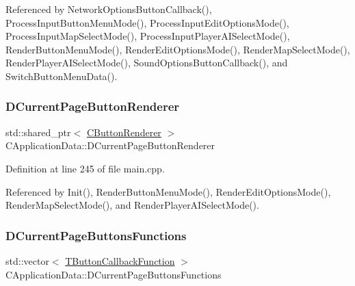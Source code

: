 Referenced by Network\+Options\+Button\+Callback(), Process\+Input\+Button\+Menu\+Mode(), Process\+Input\+Edit\+Options\+Mode(), Process\+Input\+Map\+Select\+Mode(), Process\+Input\+Player\+A\+I\+Select\+Mode(), Render\+Button\+Menu\+Mode(), Render\+Edit\+Options\+Mode(), Render\+Map\+Select\+Mode(), Render\+Player\+A\+I\+Select\+Mode(), Sound\+Options\+Button\+Callback(), and Switch\+Button\+Menu\+Data().

\hypertarget{classCApplicationData_abfe1743f2634b069ccc811db4a8733a8}{}\label{classCApplicationData_abfe1743f2634b069ccc811db4a8733a8} 
\subsubsection{\texorpdfstring{D\+Current\+Page\+Button\+Renderer}{DCurrentPageButtonRenderer}}
{\footnotesize\ttfamily std\+::shared\+\_\+ptr$<$ \hyperlink{classCButtonRenderer}{C\+Button\+Renderer} $>$ C\+Application\+Data\+::\+D\+Current\+Page\+Button\+Renderer\hspace{0.3cm}{\ttfamily [protected]}}



Definition at line 245 of file main.\+cpp.



Referenced by Init(), Render\+Button\+Menu\+Mode(), Render\+Edit\+Options\+Mode(), Render\+Map\+Select\+Mode(), and Render\+Player\+A\+I\+Select\+Mode().

\hypertarget{classCApplicationData_ad3079e5563a19d21c1e4ceff2a188382}{}\label{classCApplicationData_ad3079e5563a19d21c1e4ceff2a188382} 
\subsubsection{\texorpdfstring{D\+Current\+Page\+Buttons\+Functions}{DCurrentPageButtonsFunctions}}
{\footnotesize\ttfamily std\+::vector$<$ \hyperlink{main_8cpp_af91bc223ea3fea871af009bfef33c595}{T\+Button\+Callback\+Function} $>$ C\+Application\+Data\+::\+D\+Current\+Page\+Buttons\+Functions\hspace{0.3cm}{\ttfamily [protected]}}



